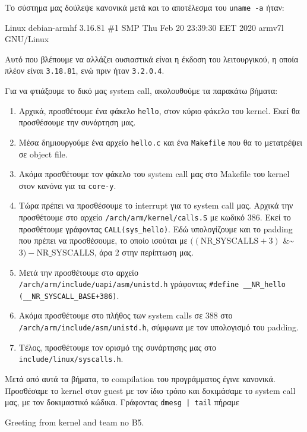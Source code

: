 \documentclass{article}
\newcommand{\english}[1]{\foreignlanguage{english}{{#1}}}
\begin{document}
Το σύστημα μας δούλεψε κανονικά μετά και το αποτέλεσμα του \english{\texttt{uname -a}} ήταν:

\begin{otherlanguage}{english}
  \begin{tcolorbox}[width=\linewidth, colback={backcolour}, colupper=black]
    Linux debian-armhf 3.16.81 \#1 SMP Thu Feb 20 23:39:30 EET 2020 armv7l GNU/Linux
  \end{tcolorbox}
\end{otherlanguage}

Αυτό που βλέπουμε να αλλάζει ουσιαστικά είναι η έκδοση του λειτουργικού, η οποία πλέον είναι \texttt{3.18.81}, ενώ πριν ήταν \texttt{3.2.0.4}.

Για να φτιάξουμε το δικό μας \english{system call}, ακολουθούμε τα παρακάτω βήματα:
\begin{enumerate}
  \item Αρχικά, προσθέτουμε ένα φάκελο \english{\texttt{hello}}, στον κύριο φάκελο του \english{kernel}. Εκεί θα προσθέσουμε την συνάρτηση μας.
  \item Μέσα δημιουργούμε ένα αρχείο \english{\texttt{hello.c}} και ένα \english{\texttt{Makefile}} που θα το μετατρέψει σε \english{object file}.
  \item Ακόμα προσθέτουμε τον φάκελο του \english{system call} μας στο \english{Makefile} του \english{kernel} στον κανόνα για τα \english{\texttt{core-y}}.
  \item Τώρα πρέπει να προσθέσουμε το \english{interrupt} για το \english{system call} μας. Αρχικά την προσθέτουμε στο αρχείο \english{\texttt{/arch/arm/kernel/calls.S}} με κωδικό $386$. Εκεί το προσθέτουμε γράφοντας \english{\texttt{CALL(sys\_hello)}}. Εδώ υπολογίζουμε και το \english{padding} που πρέπει να προσθέσουμε, το οποίο ισούται με \english{$((\text{NR\_SYSCALLS} + 3)$ \&\textasciitilde{}$3) - \text{NR\_SYSCALLS}$}, άρα 2 στην περίπτωση μας.
  \item Μετά την προσθέτουμε στο αρχείο \\ \english{\texttt{/arch/arm/include/uapi/asm/unistd.h}} γράφοντας \english{\texttt{\#define \_\_NR\_hello (\_\_NR\_SYSCALL\_BASE+386)}}. 
  \item Ακόμα προσθέτουμε στο πλήθος των \english{system calls} σε 388 στο \\ \english{\texttt{/arch/arm/include/asm/unistd.h}}, σύμφωνα με τον υπολογισμό του \english{padding}.
  \item Τέλος, προσθέτουμε τον ορισμό της συνάρτησης μας στο \english{\texttt{include/linux/syscalls.h}}.
\end{enumerate}

Μετά από αυτά τα βήματα, το \english{compilation} του προγράμματος έγινε κανονικά. Προσθέσαμε το \english{kernel} στον \english{guest} με τον ίδιο τρόπο και δοκιμάσαμε το \english{system call} μας, με τον δοκιμαστικό κώδικα. Γράφοντας \english{\texttt{dmesg | tail}} πήραμε 

\begin{otherlanguage}{english}
  \begin{tcolorbox}[width=\linewidth, colback={backcolour}, colupper=black]
    [  266.871655] Greeting from kernel and team no B5.
  \end{tcolorbox}
\end{otherlanguage}
\end{document}

